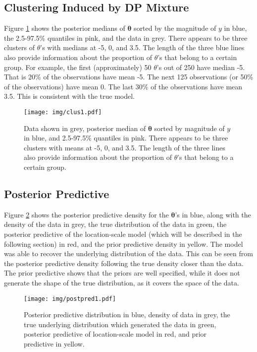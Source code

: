 \documentclass{article}
\def\beginmyfig{\begin{figure}[h]\begin{center}}
\def\endmyfig{\end{center}\end{figure}}
\newcommand{\m}[1]{\mathbf{\bm{#1}}} %
\begin{document}
\subsection{Clustering Induced by DP Mixture}
Figure \ref{fig:clus1} shows the posterior medians of $\m\theta$ sorted by the
magnitude of $y$ in blue, the 2.5-97.5\% quantiles in pink, and the data in
grey.  There appears to be three clusters of $\theta$'s with medians at -5, 0,
and 3.5. The length of the three blue lines also provide information about the
proportion of $\theta$'s that belong to a certain group. For example, the first
(approximately) 50 $\theta$'s out of 250 have median -5. That is 20\% of the
observations have mean -5. The next 125 observations (or 50\% of the
observations) have mean 0. The last 30\% of the observations have mean 3.5.
This is consistent with the true model.  \\
\beginmyfig
  \texttt{[image: img/clus1.pdf]}
  \caption{Data shown in grey, posterior median of $\m\theta$ sorted
  by magnitude of $y$ in blue, and 2.5-97.5\% quantiles in pink.
  There appears to be three clusters with means at -5, 0, and 3.5.
  The length of the three lines also provide information about 
  the proportion of $\theta$'s that belong to a certain group.}
  \label{fig:clus1}
\endmyfig


\subsection{Posterior Predictive}
Figure \ref{fig:postpred1} shows the posterior predictive density for the $\m\theta$'s 
in blue, along with the density of the data in grey, the true distribution of the data
in green, the posterior predictive of the location-scale model (which will be described
in the following section) in red, and the prior predictive density in yellow.
The model was able to recover the underlying distribution of the data. This can be seen from
the posterior predictive density following the true density closer than the data. The prior
predictive shows that the priors are well specified, while it does not generate the shape
of the true distribution, as it covers the space of the data.
\beginmyfig
  \texttt{[image: img/postpred1.pdf]}
  \caption{Posterior predictive distribution in blue, density of data in grey, the true
  underlying distribution which generated the data in green, posterior predictive of
  location-scale model in red, and prior predictive in yellow.}
  \label{fig:postpred1}
\endmyfig
\end{document}
